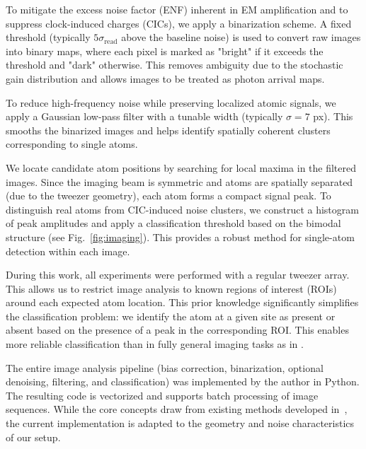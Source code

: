 To mitigate the excess noise factor (ENF) inherent in EM amplification and to suppress clock-induced charges (CICs), we apply a binarization scheme. A fixed threshold (typically $5\sigma_\text{read}$ above the baseline noise) is used to convert raw images into binary maps, where each pixel is marked as "bright" if it exceeds the threshold and "dark" otherwise. This removes ambiguity due to the stochastic gain distribution and allows images to be treated as photon arrival maps.  

To reduce high-frequency noise while preserving localized atomic signals, we apply a Gaussian low-pass filter with a tunable width (typically $\sigma = 7$ px). This smooths the binarized images and helps identify spatially coherent clusters corresponding to single atoms. 

We locate candidate atom positions by searching for local maxima in the filtered images. Since the imaging beam is symmetric and atoms are spatially separated (due to the tweezer geometry), each atom forms a compact signal peak. To distinguish real atoms from CIC-induced noise clusters, we construct a histogram of peak amplitudes and apply a classification threshold based on the bimodal structure (see Fig.~\ref{fig:imaging}). This provides a robust method for single-atom detection within each image.

During this work, all experiments were performed with a regular tweezer array. This allows us to restrict image analysis to known regions of interest (ROIs) around each expected atom location. This prior knowledge significantly simplifies the classification problem: we identify the atom at a given site as present or absent based on the presence of a peak in the corresponding ROI. This enables more reliable classification than in fully general imaging tasks as in \cite{bergschneider_spin-resolved_2018}.

The entire image analysis pipeline (bias correction, binarization, optional denoising, filtering, and classification) was implemented by the author in Python. The resulting code is vectorized and supports batch processing of image sequences. While the core concepts draw from existing methods developed in~\cite{bergschneider_spin-resolved_2018}, the current implementation is adapted to the geometry and noise characteristics of our setup. 
